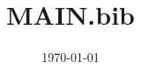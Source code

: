 \documentclass{amsart}
\title{MAIN.bib}
\date{\today}
\begin{document}
\maketitle

\nocite{*}




\end{document}
